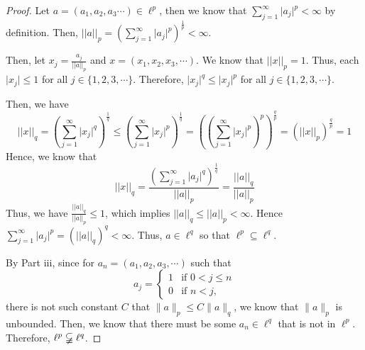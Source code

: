\begin{answer}
    \begin{proof}
        Let $a = (a_1,a_2,a_3\cdots) \in \ell^p$, then we know that $\sum_{j=1}^{\infty}{\lvert a_j \rvert^p} < \infty$ by definition. Then, $\lvert\lvert a \rvert\rvert_p = (\sum_{j=1}^{\infty}{\lvert a_j \rvert^p})^{\frac{1}{p}} < \infty$.
        
        Then, let $x_j = \tfrac{a_j}{\lvert\lvert a \rvert\rvert_p}$ and $x = (x_1,x_2,x_3,\cdots)$. We know that $\lvert\lvert x \rvert\rvert_p = 1$. Thus, each $\lvert x_j \rvert \leq 1$ for all $j \in \{1,2,3,\cdots\}$. Therefore, $\lvert x_j \rvert^q \leq \lvert x_j \rvert^p$ for all $j \in \{1,2,3,\cdots\}$.
        
        Then, we have
        \begin{equation}
                \lvert\lvert x \rvert\rvert_q = \left(\sum_{j=1}^{\infty}{\lvert x_j \rvert^q}\right)^{\frac{1}{q}} \leq \left(\sum_{j=1}^{\infty}{\lvert x_j \rvert^p}\right)^{\frac{1}{q}} = \left(\left(\sum_{j=1}^{\infty}{\lvert x_j \rvert^p}\right)^{p}\right)^{\frac{q}{p}} = \left(\lvert\lvert x \rvert\rvert_p\right)^{\frac{q}{p}} = 1
        \end{equation}
        Hence, we know that
        \begin{equation}
                \lvert\lvert x \rvert\rvert_q = \dfrac{\left(\sum_{j=1}^{\infty}{\lvert a_j \rvert^q}\right)^{\frac{1}{q}}}{\lvert\lvert a \rvert\rvert_p} = \dfrac{\lvert\lvert a \rvert\rvert_q}{\lvert\lvert a \rvert\rvert_p}
        \end{equation}
        Thus, we have $\tfrac{\lvert\lvert a \rvert\rvert_q}{\lvert\lvert a \rvert\rvert_p} \leq 1$, which implies $\lvert\lvert a \rvert\rvert_q \leq \lvert\lvert a \rvert\rvert_p <\infty$. Hence $\sum_{j=1}^{\infty}{\lvert a_j \rvert^p} = (\lvert\lvert a \rvert\rvert_q)^q < \infty$. Thus, $a \in \ell^q$ so that $\ell^p \subseteq \ell^q$.
        
        By Part iii, since for $a_n = (a_1,a_2,a_3,\cdots)$ such that 
        \begin{equation}
            a_j =
            \begin{cases}
                1 & \text{if $0 < j \leq n$}\\
                0 & \text{if $n < j$},
            \end{cases}
        \end{equation}
        there is not such constant $C$ that $\lVert a \rVert_p \leq C \lVert a \rVert_q$, we know that $\lVert a \rVert_p$ is unbounded. Then, we know that there must be some $a_n \in \ell^q$ that is not in $\ell^p$. Therefore, $\ell^p \varsubsetneqq \ell^q$.
    \end{proof}
\end{answer}

